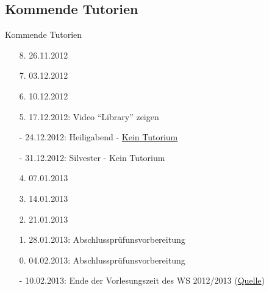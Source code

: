 \documentclass[usepdftitle=false,hyperref={pdfpagelabels=false}]{beamer}
\begin{document}
\subsection{Kommende Tutorien}
\begin{frame}{Kommende Tutorien}
  \begin{itemize}
    \item[8.] 26.11.2012
    \item[7.] 03.12.2012
    \item[6.] 10.12.2012
    \item[5.] 17.12.2012: Video "`Library"' zeigen
    \item[-] 24.12.2012: Heiligabend - \href{http://www.fmc.uni-karlsruhe.de/faq/wann-sind-die-weihnachtsferien}{Kein Tutorium}
    \item[-] 31.12.2012: Silvester - Kein Tutorium
    \item[4.] 07.01.2013
    \item[3.] 14.01.2013
    \item[2.] 21.01.2013
    \item[1.] 28.01.2013: Abschlussprüfunsvorbereitung
    \item[0.] 04.02.2013: Abschlussprüfunsvorbereitung
    \item[-] 10.02.2013: Ende der Vorlesungszeit des WS 2012/2013 (\href{http://www.kit.edu/studieren/2873.php}{Quelle})
  \end{itemize}
\end{frame}

\end{document}
